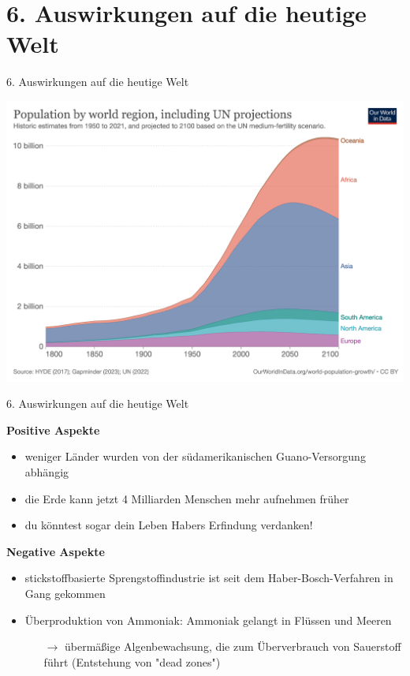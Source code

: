 \documentclass[
    aspectratio=1610
    ]{beamer}
\begin{document}
    \section{\textbf{6.} Auswirkungen auf die heutige Welt}

    \begin{frame}{6. Auswirkungen auf die heutige Welt}
            \begin{center}
                \includegraphics[scale=.1]{figures/world_pop.png}
            \end{center}
    \end{frame}

    \begin{frame}{6. Auswirkungen auf die heutige Welt}
        \begin{minipage}{6cm}
            \textbf{Positive Aspekte}
            \begin{itemize}
                \item weniger Länder wurden von der südamerikanischen Guano-Versorgung abhängig
                \item die Erde kann jetzt 4 Milliarden Menschen mehr aufnehmen früher
                \item du könntest sogar dein Leben Habers Erfindung verdanken!
            \end{itemize}    
        \end{minipage} 
        \hspace{.25cm}  
        \begin{minipage}{7cm}
            \textbf{Negative Aspekte}
            \begin{itemize}
                \item stickstoffbasierte Sprengstoffindustrie ist seit dem Haber-Bosch-Verfahren in Gang gekommen
                \item Überproduktion von Ammoniak: Ammoniak gelangt in Flüssen und Meeren
                \begin{itemize}
                    \item[$\rightarrow$] übermäßige Algenbewachsung, die zum Überverbrauch von Sauerstoff führt (Entstehung von "dead zones")
                \end{itemize}
            \end{itemize}
        \end{minipage} 
    \end{frame}
\end{document}
